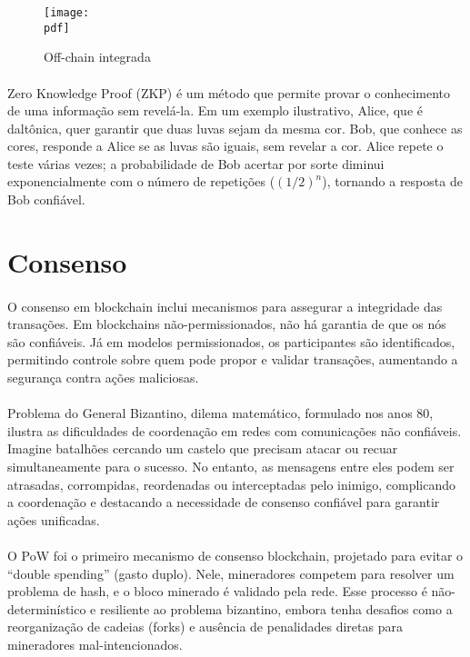 \documentclass[letterpaper,11pt,leqno]{article}
\newcommand{\pdf}{figures/figures}
\newcommand{\quotes}[1]{``#1''}
\begin{document}
\begin{figure}[H]
	{\texttt{[image: \\pdf]}}
	\caption{Off-chain integrada}
	\label{f:figure3}\end{figure}

\paragraph{}
Zero Knowledge Proof (ZKP) é um método que permite provar o conhecimento de uma
informação sem revelá-la. Em um exemplo ilustrativo, Alice, que é daltônica,
quer garantir que duas luvas sejam da mesma cor. Bob, que conhece as cores,
responde a Alice se as luvas são iguais, sem revelar a cor. Alice repete o teste
várias vezes; a probabilidade de Bob acertar por sorte diminui exponencialmente
com o número de repetições (${(1/2)}^n$), tornando a resposta de Bob confiável.

\section{Consenso}

\paragraph{}
O consenso em blockchain inclui mecanismos para assegurar a integridade das
transações. Em blockchains não-permissionados, não há garantia de que os nós são
confiáveis. Já em modelos permissionados, os participantes são identificados,
permitindo controle sobre quem pode propor e validar transações, aumentando a
segurança contra ações maliciosas.

\paragraph{}
Problema do General Bizantino, dilema matemático, formulado nos anos 80, ilustra
as dificuldades de coordenação em redes com comunicações não confiáveis. Imagine
batalhões cercando um castelo que precisam atacar ou recuar simultaneamente para
o sucesso. No entanto, as mensagens entre eles podem ser atrasadas, corrompidas,
reordenadas ou interceptadas pelo inimigo, complicando a coordenação e
destacando a necessidade de consenso confiável para garantir ações unificadas.

\paragraph{}
O PoW foi o primeiro mecanismo de consenso blockchain, projetado para evitar o
\quotes{double spending} (gasto duplo). Nele, mineradores competem para resolver
um problema de hash, e o bloco minerado é validado pela rede. Esse processo é
não-determinístico e resiliente ao problema bizantino, embora tenha desafios
como a reorganização de cadeias (forks) e ausência de penalidades diretas para
mineradores mal-intencionados.
\end{document}

